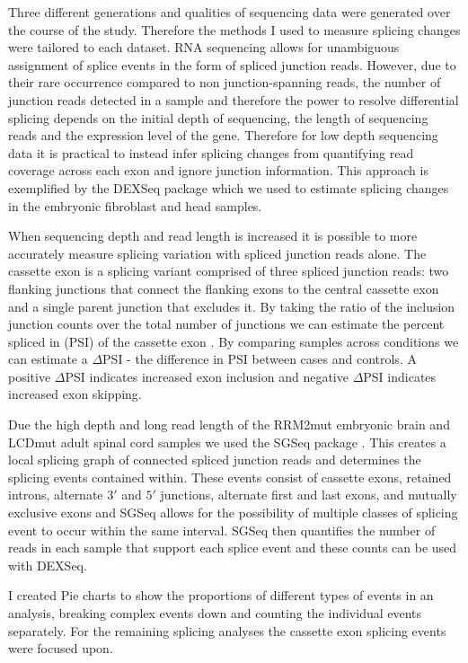 Three different generations and qualities of sequencing data were generated over the course of the  study.  Therefore  the  methods I  used  to  measure  splicing  changes  were  tailored  to  each 
dataset. RNA sequencing allows for unambiguous assignment of splice events in the form of spliced junction reads. 
However, due to their rare occurrence compared to non junction-spanning reads, the number of junction reads detected in a sample and therefore the power to resolve differential splicing depends on the initial depth of sequencing, the length of sequencing reads and the expression level of the gene. Therefore for low depth sequencing data it is practical to instead infer splicing changes from quantifying read coverage across each exon and ignore junction information. This approach is exemplified by the DEXSeq package \citep{Anders2012} which we used to estimate splicing changes in the embryonic fibroblast and head samples.

When sequencing depth and read length is increased it is possible to more accurately measure splicing variation with spliced junction reads alone. The cassette exon is a splicing variant comprised of three spliced junction reads: two flanking junctions that connect the flanking exons to the central cassette exon and a single parent junction that excludes it. By taking the ratio of the inclusion junction counts over the total number of junctions we can estimate the percent spliced in (PSI) of the cassette exon \citep{Katz2010-ir}. By comparing samples across conditions we can estimate a $\Delta$PSI - the difference in PSI between cases and controls. A positive $\Delta$PSI indicates increased exon inclusion and negative $\Delta$PSI indicates increased exon skipping. 

Due the high depth and long read length of the RRM2mut embryonic brain and LCDmut adult spinal cord samples we used the SGSeq package \citep{Goldstein2016}. This creates a local splicing graph of connected spliced junction reads and determines the splicing events contained within. These events consist of cassette exons, retained introns, alternate $3'$ and $5'$ junctions, alternate first and last exons, and mutually exclusive exons and SGSeq allows for the possibility of multiple classes of splicing event to occur within  the same interval. SGSeq  then quantifies  the number of  reads in each sample  that support each splice event and these counts can be used with DEXSeq. 

I created Pie charts to show the proportions of different types of events in an analysis, breaking complex  events  down  and  counting  the  individual  events  separately.  For  the  remaining splicing analyses the cassette exon splicing events were focused upon.


